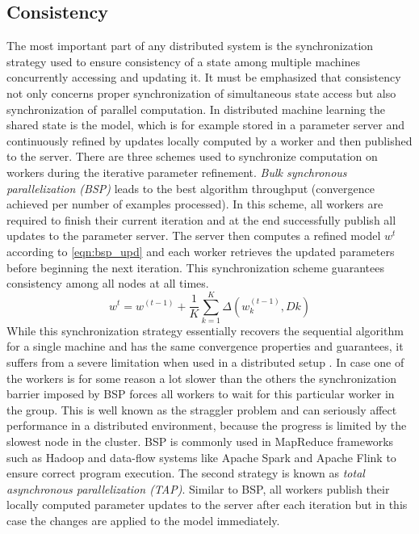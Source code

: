 \subsection{Consistency}
\label{ss:consistency}
The most important part of any distributed system is the synchronization strategy used to ensure consistency of a state among multiple machines concurrently accessing and updating it.
It must be emphasized that consistency not only concerns proper synchronization of simultaneous state access but also synchronization of parallel computation.
In distributed machine learning the shared state is the model, which is for example stored in a parameter server and continuously refined by updates locally computed by a worker and then published to the server.
There are three schemes used to synchronize computation on workers during the iterative parameter refinement.
\textit{Bulk synchronous parallelization (BSP)} leads to the best algorithm throughput (convergence achieved per number of examples processed).
In this scheme, all workers are required to finish their current iteration and at the end successfully publish all updates to the parameter server.
The server then computes a refined model $w^t$ according to \ref{eqn:bsp_upd} and each worker retrieves the updated parameters before beginning the next iteration.
This synchronization scheme guarantees consistency among all nodes at all times.
\begin{equation}
w^{t} = w^{(t-1)} + \frac{1}{K}\sum_{k=1}^{K}\Delta(w^{(t-1)}_{k}, D{k})
\label{eqn:bsp_upd}
\end{equation}
While this synchronization strategy essentially recovers the sequential algorithm for a single machine and has the same convergence properties and guarantees, it suffers from a severe limitation when used in a distributed setup \cite{langford2009slow}.
In case one of the workers is for some reason a lot slower than the others the synchronization barrier imposed by BSP forces all workers to wait for this particular worker in the group.
This is well known as the straggler problem \cite{ananthanarayanan2013effective} and can seriously affect performance in a distributed environment, because the progress is limited by the slowest node in the cluster.
BSP is commonly used in MapReduce frameworks such as Hadoop and data-flow systems like Apache Spark and Apache Flink to ensure correct program execution.
The second strategy is known as \textit{total asynchronous parallelization (TAP)}.
Similar to BSP, all workers publish their locally computed parameter updates to the server after each iteration but in this case the changes are applied to the model immediately.
